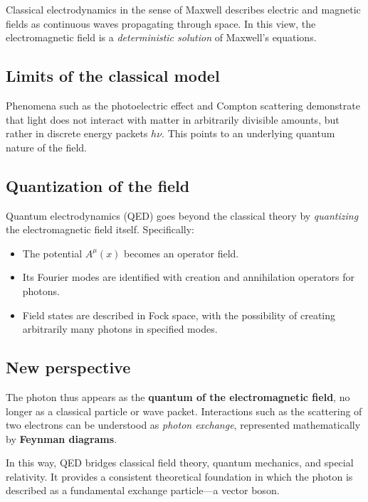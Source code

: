 Classical electrodynamics in the sense of Maxwell describes electric and 
magnetic fields as continuous waves propagating through space. 
In this view, the electromagnetic field is a 
\emph{deterministic solution} of Maxwell’s equations.

\subsection*{Limits of the classical model}
Phenomena such as the photoelectric effect and Compton scattering
demonstrate that light does not interact with matter in arbitrarily divisible amounts, 
but rather in discrete energy packets \( h\nu \). 
This points to an underlying quantum nature of the field.

\subsection*{Quantization of the field}
Quantum electrodynamics (QED) goes beyond the classical theory by 
\emph{quantizing} the electromagnetic field itself. Specifically:
\begin{itemize}
	\item The potential \( A^\mu(x) \) becomes an operator field.
	\item Its Fourier modes are identified with creation and annihilation operators 
	for photons.
	\item Field states are described in Fock space, 
	with the possibility of creating arbitrarily many photons in specified modes.
\end{itemize}

\subsection*{New perspective}
The photon thus appears as the \textbf{quantum of the electromagnetic field}, 
no longer as a classical particle or wave packet. 
Interactions such as the scattering of two electrons can be understood as 
\emph{photon exchange}, represented mathematically by \textbf{Feynman diagrams}. 

\medskip
In this way, QED bridges classical field theory, quantum mechanics, and special relativity. 
It provides a consistent theoretical foundation in which the photon is described as a 
fundamental exchange particle—a vector boson.

